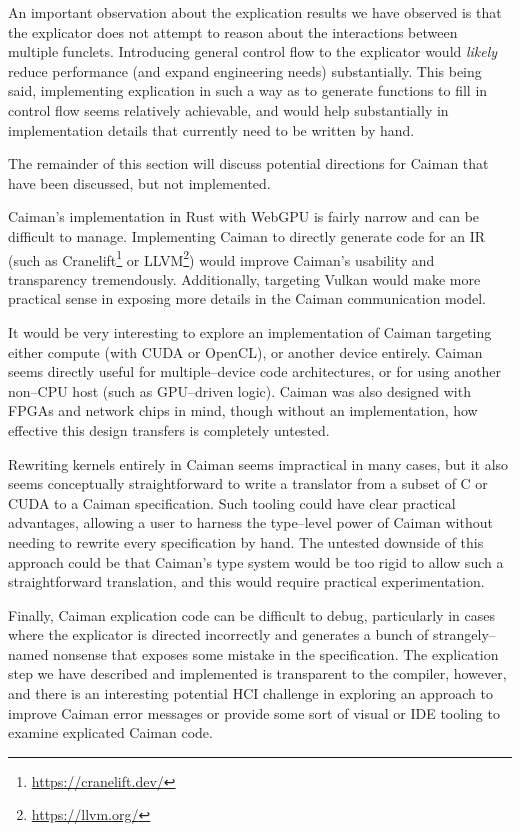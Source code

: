 An important observation about the explication results we have observed is that the explicator does not attempt to reason about the interactions between multiple funclets.  Introducing general control flow to the explicator would \emph{likely} reduce performance (and expand engineering needs) substantially.  This being said, implementing explication in such a way as to generate functions to fill in control flow seems relatively achievable, and would help substantially in implementation details that currently need to be written by hand.

The remainder of this section will discuss potential directions for Caiman that have been discussed, but not implemented.

Caiman's implementation in Rust with WebGPU is fairly narrow and can be difficult to manage.  Implementing Caiman to directly generate code for an IR (such as Cranelift\footnote{\url{https://cranelift.dev/}} or LLVM\footnote{\url{https://llvm.org/}}) would improve Caiman's usability and transparency tremendously.  Additionally, targeting Vulkan would make more practical sense in exposing more details in the Caiman communication model.

It would be very interesting to explore an implementation of Caiman targeting either compute (with CUDA or OpenCL), or another device entirely.  Caiman seems directly useful for multiple--device code architectures, or for using another non--CPU host (such as GPU--driven logic).  Caiman was also designed with FPGAs and network chips in mind, though without an implementation, how effective this design transfers is completely untested.

Rewriting kernels entirely in Caiman seems impractical in many cases, but it also seems conceptually straightforward to write a translator from a subset of C or CUDA to a Caiman specification.  Such tooling could have clear practical advantages, allowing a user to harness the type--level power of Caiman without needing to rewrite every specification by hand.  The untested downside of this approach could be that Caiman's type system would be too rigid to allow such a straightforward translation, and this would require practical experimentation.

Finally, Caiman explication code can be difficult to debug, particularly in cases where the explicator is directed incorrectly and generates a bunch of strangely--named nonsense that exposes some mistake in the specification.  The explication step we have described and implemented is transparent to the compiler, however, and there is an interesting potential HCI challenge in exploring an approach to improve Caiman error messages or provide some sort of visual or IDE tooling to examine explicated Caiman code.